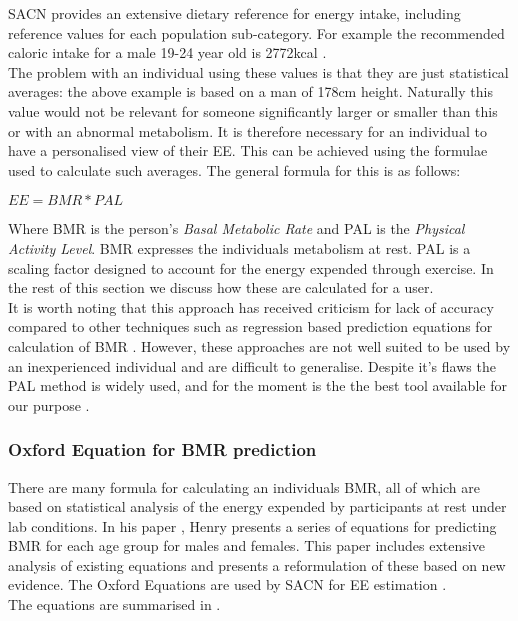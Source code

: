 \documentclass{article}
\begin{document}
SACN provides an extensive dietary reference for energy intake, including reference values for each population sub-category. For example the recommended caloric intake for a male 19-24 year old is 2772kcal \cite[p.~85, table~16]{SACNDietaryReference}.\\

The problem with an individual using these values is that they are just statistical averages: the above example is based on a man of 178cm height. Naturally this value would not be relevant for someone significantly larger or smaller than this or with an abnormal metabolism. It is therefore necessary for an individual to have a personalised view of their EE. This can be achieved using the formulae used to calculate such averages. The general formula for this is as follows:
\begin{center}
$EE = BMR * PAL$
\end{center}
Where BMR is the person's \emph{Basal Metabolic Rate} and PAL is the \emph{Physical Activity Level}. BMR expresses the individuals metabolism at rest. PAL is a scaling factor designed to account for the energy expended through exercise. In the rest of this section we discuss how these are calculated for a user.\\
It is worth noting that this approach has received criticism for lack of accuracy compared to other techniques such as regression based prediction equations for calculation of BMR \cite{Goran2005}. However, these approaches are not well suited to be used by an inexperienced individual and are difficult to generalise. Despite it's flaws the PAL method is widely used, and for the moment is the the best tool available for our purpose \cite[pg.~110]{SACNDietaryReference}.\\

\subsubsection{Oxford Equation for BMR prediction}
There are many formula for calculating an individuals BMR, all of which are based on statistical analysis of the energy expended by participants at rest under lab conditions. In his paper \cite{OxfordEquations}, Henry presents a series of equations for predicting BMR for each age group for males and females. This paper includes extensive analysis of existing equations and presents a reformulation of these based on new evidence. The Oxford Equations are used by SACN for EE estimation \cite[p.~104]{SACNDietaryReference}.\\
The equations are summarised in \cite[Table.~15]{OxfordEquations}.
\end{document}
